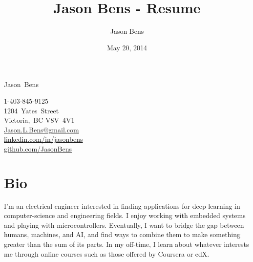 \documentclass[a4paper, 10pt]{article}
\title{Jason Bens - Resume}
\author{Jason Bens}
\date{May 20, 2014}
\makeatletter
\newcommand {\firstname} {Jason}
\newcommand {\lastname} {Bens}
\newcommand {\address} {
  \mbox{1204 Yates Street}\\
  \mbox{Victoria, BC}
  \mbox{V8V 4V1}
}
\newcommand {\phone} {\mbox{1-403-845-9125}}
\newcommand {\email} {\url{Jason.L.Bens@gmail.com}}
\newcommand {\linkedin} {\url{linkedin.com/in/jasonbens}}
\newcommand {\github} {\url{github.com/JasonBens}}
\makeatother
\begin{document}
\begin{minipage}[t]{0.7\textwidth}
  \begin{center}
    {\Huge \firstname~\lastname}
  \end{center}
\end{minipage}\hfill
\begin{minipage}{0.3\textwidth}
  \begin{flushright}
    \phone \\
    \address \\
    \email \\
    \linkedin \\
    \github \\
  \end{flushright}
\end{minipage}

\hrulefill

\section{Bio}
I'm an electrical engineer interested in finding applications for deep learning in computer-science and engineering fields. I enjoy working with embedded systems and playing with microcontrollers. Eventually, I want to bridge the gap between humans, machines, and AI, and find ways to combine them to make something greater than the sum of its parts. In my off-time, I learn about whatever interests me through online courses such as those offered by Coursera or edX.
\end{document}
